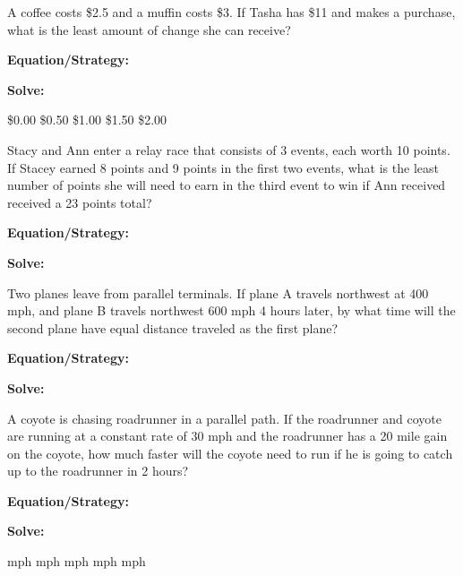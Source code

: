 \vfill
\newpage
\begin{multicols*}{2}
\begin{outline}[enumerate]
\medium

\1 A coffee costs \$2.5 and a muffin costs \$3. If Tasha has \$11 and makes a purchase, what is the least amount of change she can receive?

\bigskip
\textbf{Equation/Strategy:} \hrulefill

\bigskip
\textbf{Solve:}

\vfill
\2 \$0.00
\2 \$0.50
\2 \$1.00
\2 \$1.50
\2 \$2.00

\midline

\1 Stacy and Ann enter a relay race that consists of 3 events, each worth 10 points. If Stacey earned 8 points and 9 points in the first two events, what is the least number of points she will need to earn in the third event to win if Ann received received a 23 points total?

\bigskip
\textbf{Equation/Strategy:} \hrulefill

\bigskip
\textbf{Solve:}

\vfill
{}

\columnbreak
\advanced

\1 Two planes leave from parallel terminals. If plane A travels northwest at 400 mph, and plane B travels northwest 600 mph 4 hours later, by what time will the second plane have equal distance traveled as the first plane?

\bigskip
\textbf{Equation/Strategy:} \hrulefill

\bigskip
\textbf{Solve:}

\vfill
{}

\midline

\1 A coyote is chasing roadrunner in a parallel path. If the roadrunner and coyote are running at a constant rate of 30 mph and the roadrunner has a 20 mile gain on the coyote, how much faster will the coyote need to run if he is going to catch up to the roadrunner in 2 hours?

\bigskip
\textbf{Equation/Strategy:} \hrulefill

\bigskip
\textbf{Solve:}

\vfill
{} mph
 mph
 mph
 mph
 mph
\end{outline}
\end{multicols*}